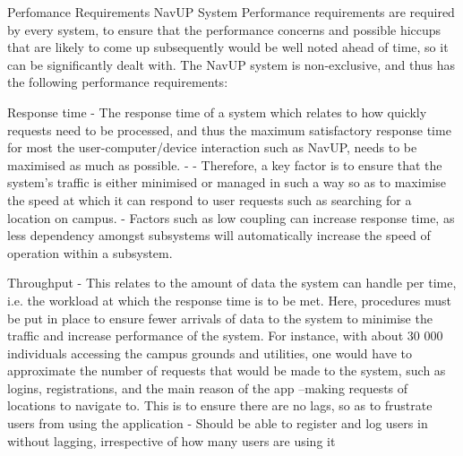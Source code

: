 Perfomance Requirements
NavUP System
Performance requirements are required by every system, to ensure that the performance concerns and possible hiccups that are likely to come up subsequently would be well noted ahead of time, so it can be significantly dealt with. The NavUP system is non-exclusive, and thus has the following performance requirements:

Response time 
-	The response time of a system which relates to how quickly requests need to be processed, and thus the maximum satisfactory response time for most the user-computer/device interaction such as NavUP, needs to be maximised as much as possible. 
-	
-	Therefore, a key factor is to ensure that the system’s traffic is either minimised or managed in such a way so as to maximise the speed at which it can respond to user requests such as searching for a location on campus. 
-	Factors such as low coupling can increase response time, as less dependency amongst subsystems will automatically increase the speed of operation within a subsystem.

Throughput 
-	This relates to the amount of data the system can handle per time, i.e. the workload at which the response time is to be met. Here, procedures must be put in place to ensure fewer arrivals of data to the system to minimise the traffic and increase performance of the system. For instance, with about 30 000 individuals accessing the campus grounds and utilities, one would have to approximate the number of requests that would be made to the system, such as logins, registrations, and the main reason of the app –making requests of locations to navigate to. This is to ensure there are no lags, so as to frustrate users from using the application
-	Should be able to register and log users in without lagging, irrespective of how many users are using it
